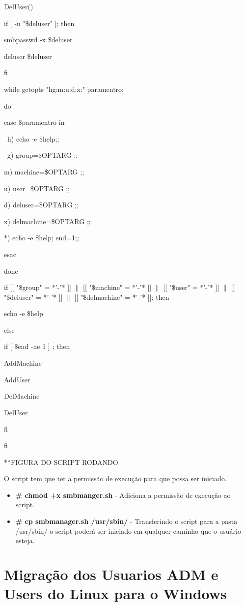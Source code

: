 DelUser(){

if [ -n "\$deluser" ]; then    

    smbpasswd -x \$deluser

    deluser \$deluser

fi

}

while getopts "hg:m:u:d:x:" paramentro;

do

   case \$paramentro in

     \ h) echo -e \$help;;

     \ g) group=\$OPTARG ;;

      m) machine=\$OPTARG ;;

      u) user=\$OPTARG ;;

      d) deluser=\$OPTARG ;;

      x) delmachine=\$OPTARG ;;

      *) echo -e \$help; end=1;;

   esac

done

if [[ "\$group" = *'-'* ]] $\|$ [[ "\$machine" = *'-'* ]] $\|$ [[ "\$user" = *'-'* ]] $\|$ [[ "\$deluser" = *'-'* ]] $\|$ [[ "\$delmachine" = *'-'* ]]; then

    echo -e \$help

else

    if [ \$end -ne 1 ] ; then

        AddMachine

        AddUser

        DelMachine

        DelUser

    fi

fi

**FIGURA DO SCRIPT RODANDO

O script tem que ter a permissão de execução para que possa ser iniciado.

\begin{itemize}
	\item \textbf{\# chmod +x smbmanger.sh} - Adiciona a permissão de execução ao script.
	\item \textbf{\# cp smbmanager.sh /usr/sbin/} - Transferindo o script para a pasta /usr/sbin/ o script poderá ser iniciado em qualquer caminho que o usuário esteja.
\end{itemize}

\section{Migração dos Usuarios ADM e Users do Linux para o Windows}

